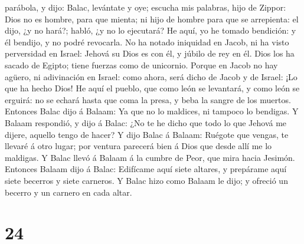 parábola, y dijo: Balac, levántate y oye; escucha mis palabras, hijo de
Zippor:  Dios no es hombre, para que mienta; ni hijo de
hombre para que se arrepienta: el dijo, ¿y no hará?; habló, ¿y no lo
ejecutará?  He aquí, yo he tomado bendición: y él bendijo,
y no podré revocarla.  No ha notado iniquidad en Jacob, ni
ha visto perversidad en Israel: Jehová su Dios es con él, y júbilo de
rey en él.  Dios los ha sacado de Egipto; tiene fuerzas
como de unicornio.  Porque en Jacob no hay agüero, ni
adivinación en Israel: como ahora, será dicho de Jacob y de Israel: ¡Lo
que ha hecho Dios!  He aquí el pueblo, que como león se
levantará, y como león se erguirá: no se echará hasta que coma la presa,
y beba la sangre de los muertos.  Entonces Balac dijo á
Balaam: Ya que no lo maldices, ni tampoco lo bendigas.  Y
Balaam respondió, y dijo á Balac: ¿No te he dicho que todo lo que Jehová
me dijere, aquello tengo de hacer?  Y dijo Balac á Balaam:
Ruégote que vengas, te llevaré á otro lugar; por ventura parecerá bien á
Dios que desde allí me lo maldigas.  Y Balac llevó á Balaam
á la cumbre de Peor, que mira hacia Jesimón.  Entonces
Balaam dijo á Balac: Edifícame aquí siete altares, y prepárame aquí
siete becerros y siete carneros.  Y Balac hizo como Balaam
le dijo; y ofreció un becerro y un carnero en cada altar.

\hypertarget{section-23}{%
\section{24}\label{section-23}}

